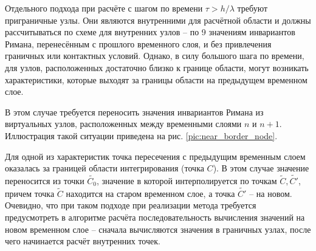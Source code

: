 Отдельного подхода при расчёте с шагом по времени $\tau > h / \lambda$ требуют приграничные узлы. Они являются внутренними для расчётной области и должны рассчитываться по схеме для внутренних узлов -- по 9 значениям инвариантов Римана, перенесённым с прошлого временного слоя, и без привлечения граничных или контактных условий. Однако, в силу большого шага по времени, для узлов, расположенных достаточно близко к границе области, могут возникать характеристики, которые выходят за границы области на предыдущем временном слое.

В этом случае требуется переносить значения инвариантов Римана из виртуальных узлов, расположенных между временными слоями $n$ и $n+1$. Иллюстрация такой ситуации приведена на рис. \ref{pic:near_border_node}. 

Для одной из характеристик точка пересечения с предыдущим временным слоем оказалась за границей области интегрирования (точка $C$). В этом случае значение переносится из точки $\tilde{C_0}$, значение в которой интерполируется по точкам $\tilde{C}, \tilde{C'}$, причем точка $\tilde{C}$ находится на старом временном слое, а точка $\tilde{C'}$ -- на новом. Очевидно, что при таком подходе при реализации метода требуется предусмотреть в алгоритме расчёта последовательность вычисления значений на новом временном слое -- сначала вычисляются значения в граничных узлах, после чего начинается расчёт внутренних точек.

